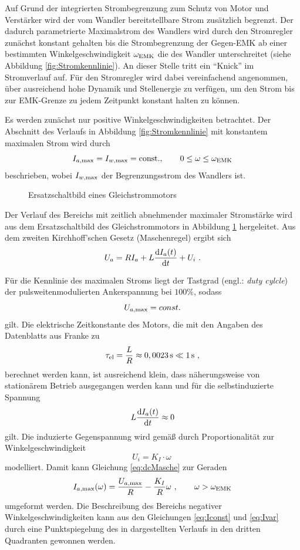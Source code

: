 Auf Grund der integrierten Strombegrenzung zum Schutz von Motor und Verstärker wird der vom Wandler bereitstellbare Strom zusätzlich begrenzt. Der dadurch parametrierte Maximalstrom des Wandlers wird durch den Stromregler zunächst konstant gehalten bis die Strombegrenzung der Gegen-EMK ab einer bestimmten Winkelgeschwindigkeit $\omega_{\mathrm{EMK}}$ die des Wandler unterschreitet (siehe Abbildung \ref{fig:Stromkennlinie}). An dieser Stelle tritt ein "`Knick"' im Stromverlauf auf. Für den Stromregler wird dabei vereinfachend angenommen, über ausreichend hohe Dynamik und Stellenergie zu verfügen, um den Strom bis zur EMK-Grenze zu jedem Zeitpunkt konstant halten zu können.

Es werden zunächst nur positive Winkelgeschwindigkeiten betrachtet. 
Der Abschnitt des Verlaufs in Abbildung \ref{fig:Stromkennlinie} mit konstantem maximalen Strom wird durch
\begin{equation}
	I_{a \mathrm{, max}}  = I_{w\mathrm{, max}} = \mathrm{const.}, \qquad 0 \leq \omega \leq \omega_{\mathrm{EMK}}
	\label{eq:Iconst}
\end{equation}
beschrieben, wobei $I_{w\mathrm{, max}}$ der Begrenzungsstrom des Wandlers ist.

\begin{figure}[h]
	\centering
		
	\caption{Ersatzschaltbild eines Gleichstrommotors}
	\label{fig:dcESB}
\end{figure}

Der Verlauf des Bereichs mit zeitlich abnehmender maximaler Stromstärke wird aus dem Ersatzschaltbild des Gleichstrommotors in Abbildung \ref{fig:dcESB} hergeleitet. Aus dem zweiten Kirchhoff'schen Gesetz (Maschenregel) ergibt sich
\begin{equation}
	U_a =  RI_a + L \frac{\mathrm{d}I_a(t)}{\mathrm{d}t} + U_i \ . 
	\label{eq:dcMasche}
\end{equation}

Für die Kennlinie des maximalen Stroms liegt der Tastgrad (engl.: \textit{duty cylcle}) der pulsweitenmodulierten Ankerspannung bei $100\%$, sodass 
\[
	U_{a \mathrm{, max}}  = const.
\]
gilt. Die elektrische Zeitkonstante des Motors, die mit den Angaben des Datenblatts aus Franke \cite{franke} zu 
\[
	\tau_{\mathrm{el}} = \frac{L}{R} \approx 0,0023\,\mathrm{s} \ll 1\,\mathrm{s} \ ,
\]
berechnet werden kann, ist ausreichend klein, dass näherungsweise von stationärem Betrieb ausgegangen werden kann und für die selbstinduzierte Spannung 
\[
	L \frac{\mathrm{d}I_a(t)}{\mathrm{d}t} \approx 0
\]
gilt. Die induzierte Gegenspannung wird gemäß \cite{binder} durch Proportionalität zur Winkelgeschwindigkeit
\[
	U_i  = K_I \cdot \omega \ 
\]
modelliert.
Damit kann Gleichung \eqref{eq:dcMasche} zur Geraden
\begin{equation}
	I_{a \mathrm{, max}}(\omega) = \frac{U_{a \mathrm{, max}}}{R} - \frac{K_I}{R} \omega \ , \qquad \omega > \omega_{\mathrm{EMK}} 
	\label{eq:Ivar}
\end{equation}
umgeformt werden.
Die Beschreibung des Bereichs negativer Winkelgeschwindigkeiten kann aus den Gleichungen \eqref{eq:Iconst} und \eqref{eq:Ivar} durch eine Punktspiegelung des in  dargestellten Verlaufs in den dritten Quadranten gewonnen werden.

